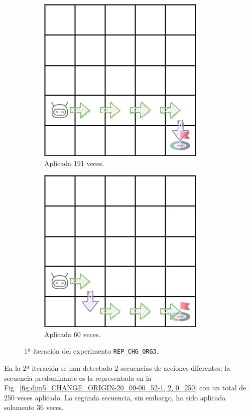 \begin{figure}
    \centering
    \begin{subfigure}{.5\textwidth}
        \centering
        \includegraphics[scale=0.4]{cap5_experimentacion/images/dim5_CHANGE_ORIGIN-20_09-00_52-1, 0, 2_139.png}
        \caption{Aplicada 191 veces.}
        \label{fig:dim5_CHANGE_ORIGIN-20_09-00_52-1, 2, 0_191}
    \end{subfigure}%
    \begin{subfigure}{.5\textwidth}
        \centering
        \includegraphics[scale=0.4]{cap5_experimentacion/images/dim5_CHANGE_ORIGIN-20_09-00_52-1, 0, 2_120.png}
        \caption{Aplicada 60 veces.}
        \label{fig:dim5_CHANGE_ORIGIN-20_09-00_52-1, 2, 0_60}
    \end{subfigure}
    \caption{1ª iteración del experimento \texttt{REP\_CHG\_ORG3}.}
    \label{fig:dim5_CHANGE_ORIGIN-20_09-00_52-1, 2, 0_1iter}
\end{figure}

En la 2ª iteración se han detectado 2 secuencias de acciones diferentes; la secuencia predominante es la representada en la  Fig.~\ref{fig:dim5_CHANGE_ORIGIN-20_09-00_52-1, 2, 0_250} con un total de 250 veces aplicado. La segunda secuencia, sin embargo, ha sido aplicada solamente 36 veces.  \\
 
